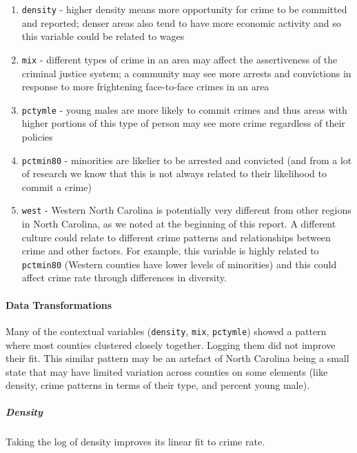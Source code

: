 \documentclass[]{article}
\let\oldparagraph\paragraph
\renewcommand{\paragraph}[1]{\oldparagraph{#1}\mbox{}}
\let\oldsubparagraph\subparagraph
\renewcommand{\subparagraph}[1]{\oldsubparagraph{#1}\mbox{}}
\begin{document}
\begin{enumerate}
\def\labelenumi{(\arabic{enumi})}
\setcounter{enumi}{5}
\item
  \texttt{density} - higher density means more opportunity for crime to
  be committed and reported; denser areas also tend to have more
  economic activity and so this variable could be related to wages
\item
  \texttt{mix} - different types of crime in an area may affect the
  assertiveness of the criminal justice system; a community may see more
  arrests and convictions in response to more frightening face-to-face
  crimes in an area
\item
  \texttt{pctymle} - young males are more likely to commit crimes and
  thus areas with higher portions of this type of person may see more
  crime regardless of their policies
\item
  \texttt{pctmin80} - minorities are likelier to be arrested and
  convicted (and from a lot of research we know that this is not always
  related to their likelihood to commit a crime)
\item
  \texttt{west} - Western North Carolina is potentially very different
  from other regions in North Carolina, as we noted at the beginning of
  this report. A different culture could relate to different crime
  patterns and relationships between crime and other factors. For
  example, this variable is highly related to \texttt{pctmin80} (Western
  counties have lower levels of minorities) and this could affect crime
  rate through differences in diversity.
\end{enumerate}

\hypertarget{data-transformations-2}{%
\paragraph{Data Transformations}\label{data-transformations-2}}

Many of the contextual variables (\texttt{density}, \texttt{mix},
\texttt{pctymle}) showed a pattern where most counties clustered closely
together. Logging them did not improve their fit. This similar pattern
may be an artefact of North Carolina being a small state that may have
limited variation across counties on some elements (like density, crime
patterns in terms of their type, and percent young male).

\hypertarget{density}{%
\subparagraph{Density}\label{density}}

Taking the log of density improves its linear fit to crime rate.
\end{document}
